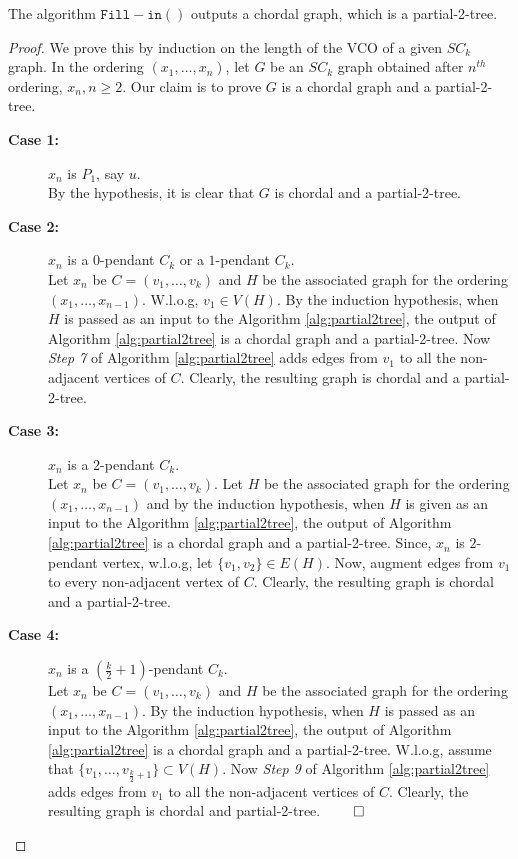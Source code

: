 \documentclass[runningheads]{llncs}
\begin{document}
\begin{theorem}
\label{fill-in}
The algorithm $\mathtt{Fill-in( )}$ outputs a chordal graph, which is a partial-2-tree.
\end{theorem}
\begin{proof}
We prove this by induction on the length of the VCO of a given $SC_k$ graph.
In the ordering $(x_1, \ldots, x_n)$, let $G$ be an $SC_k$ graph obtained after $n^{th}$ ordering, $x_n, n \geq 2$. Our claim is to prove $G$ is a chordal graph and a partial-2-tree.
\begin{description}
\item[\textbf{Case 1:}] $x_n$ is $P_1$, say $u$.\\
By the hypothesis, it is clear that $G$ is chordal and a partial-2-tree.

\item[\textbf{Case 2:}] $x_n$ is a $0$-pendant $C_k$ or a $1$-pendant $C_k$.\\
Let $x_n$ be $C=(v_1,\ldots, v_k)$ and $H$ be the associated graph for the ordering $(x_1,\ldots,x_{n-1})$. W.l.o.g, $v_1\in V(H)$. By the induction hypothesis, when $H$ is passed as an input to the Algorithm \ref{alg:partial2tree}, the output of Algorithm \ref{alg:partial2tree} is a chordal graph and a partial-2-tree. Now \emph{Step 7} of Algorithm \ref{alg:partial2tree} adds edges from $v_1$ to all the non-adjacent vertices of $C$. Clearly, the resulting graph is chordal and a partial-2-tree.

\item[\textbf{Case 3:}] $x_n$ is a $2$-pendant $C_k$.\\
Let $x_n$ be $C=(v_1,\ldots, v_k)$. Let $H$ be the associated graph for the ordering $(x_1,\ldots,x_{n-1})$ and by the induction hypothesis, when $H$ is given as an input to the Algorithm \ref{alg:partial2tree}, the output of Algorithm \ref{alg:partial2tree} is a chordal graph and a partial-2-tree. Since, $x_n$ is $2$-pendant vertex, w.l.o.g, let $\{v_1,v_2\}\in E(H)$. Now, augment edges from $v_1$ to every non-adjacent vertex of $C$. Clearly, the resulting graph is chordal and a partial-2-tree.

\item[\textbf{Case 4:}] $x_n$ is a $\left(\frac{k}{2}+1\right)$-pendant $C_k$.\\
Let $x_n$ be $C=(v_1,\ldots, v_k)$ and $H$ be the associated graph for the ordering $(x_1,\ldots,x_{n-1})$. By the induction hypothesis, when $H$ is passed as an input to the Algorithm \ref{alg:partial2tree}, the output of Algorithm \ref{alg:partial2tree} is a chordal graph and a partial-2-tree. W.l.o.g, assume that $ \{v_1,\ldots, v_{\frac{k}{2}+1}\}\subset V(H)$. Now \emph{Step 9} of Algorithm \ref{alg:partial2tree} adds edges from $v_1$ to all the non-adjacent vertices of $C$. Clearly, the resulting graph is chordal and partial-2-tree. $\hfill \qed$
\end{description}
\end{proof}
\end{document}
